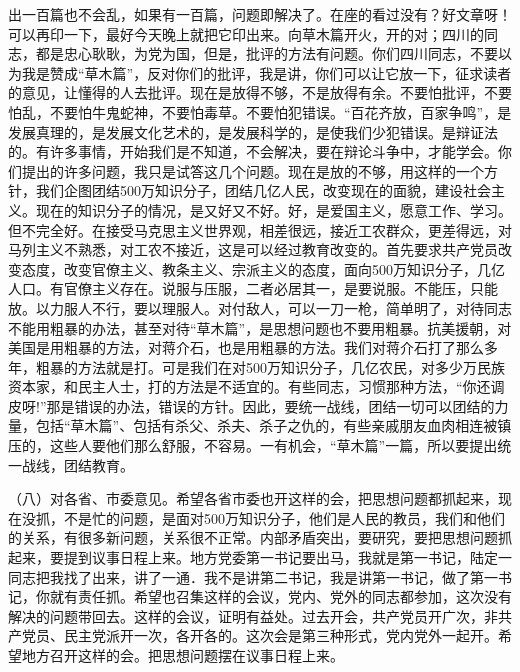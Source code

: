 出一百篇也不会乱，如果有一百篇，问题即解决了。在座的看过没有？好文章呀！可以再印一下，最好今天晚上就把它印出来。向草木篇开火，开的对；四川的同志，都是忠心耿耿，为党为国，但是，批评的方法有问题。你们四川同志，不要以为我是赞成“草木篇”，反对你们的批评，我是讲，你们可以让它放一下，征求读者的意见，让懂得的人去批评。现在是放得不够，不是放得有余。不要怕批评，不要怕乱，不要怕牛鬼蛇神，不要怕毒草。不要怕犯错误。“百花齐放，百家争鸣”，是发展真理的，是发展文化艺术的，是发展科学的，是使我们少犯错误。是辩证法的。有许多事情，开始我们是不知道，不会解决，要在辩论斗争中，才能学会。你们提出的许多问题，我只是试答这几个问题。现在是放的不够，用这样的一个方针，我们企图团结500万知识分子，团结几亿人民，改变现在的面貌，建设社会主义。现在的知识分子的情况，是又好又不好。好，是爱国主义，愿意工作、学习。但不完全好。在接受马克思主义世界观，相差很远，接近工农群众，更差得远，对马列主义不熟悉，对工农不接近，这是可以经过教育改变的。首先要求共产党员改变态度，改变官僚主义、教条主义、宗派主义的态度，面向500万知识分子，几亿人口。有官僚主义存在。说服与压服，二者必居其一，是要说服。不能压，只能放。以力服人不行，要以理服人。对付敌人，可以一刀一枪，简单明了，对待同志不能用粗暴的办法，甚至对待“草木篇”，是思想问题也不要用粗暴。抗美援朝，对美国是用粗暴的方法，对蒋介石，也是用粗暴的方法。我们对蒋介石打了那么多年，粗暴的方法就是打。可是我们在对500万知识分子，几亿农民，对多少万民族资本家，和民主人士，打的方法是不适宜的。有些同志，习惯那种方法，“你还调皮呀!”那是错误的办法，错误的方针。因此，要统一战线，团结一切可以团结的力量，包括“草木篇”、包括有杀父、杀夫、杀子之仇的，有些亲戚朋友血肉相连被镇压的，这些人要他们那么舒服，不容易。一有机会，“草木篇”一篇，所以要提出统一战线，团结教育。

（八）对各省、市委意见。希望各省市委也开这样的会，把思想问题都抓起来，现在没抓，不是忙的问题，是面对500万知识分子，他们是人民的教员，我们和他们的关系，有很多新问题，关系很不正常。内部矛盾突出，要研究，要把思想问题抓起来，要提到议事日程上来。地方党委第一书记要出马，我就是第一书记，陆定一同志把我找了出来，讲了一通．我不是讲第二书记，我是讲第一书记，做了第一书记，你就有责任抓。希望也召集这样的会议，党内、党外的同志都参加，这次没有解决的问题带回去。这样的会议，证明有益处。过去开会，共产党员开广次，非共产党员、民主党派开一次，各开各的。这次会是第三种形式，党内党外一起开。希望地方召开这样的会。把思想问题摆在议事日程上来。


